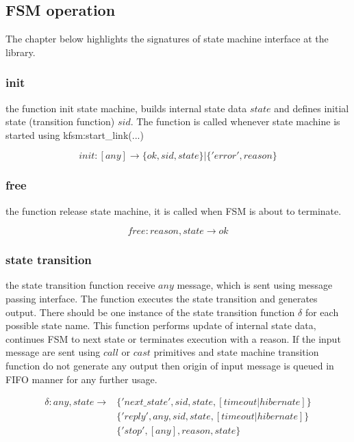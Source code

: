 \documentclass{report}
\begin{document}
\subsection{FSM operation}
   The chapter below highlights the signatures of state machine interface at 
   the library.

\subsubsection{init}
	the function init state machine, builds internal state data $state$ and defines
	initial state (transition function) $sid$. The function is called whenever 
	state machine is started using kfsm:start\_link(...)
	
	$$ init: [any] \longrightarrow \{ok, sid, state\} | \{'error', reason\} $$
	
	

\subsubsection{free}
	the function release state machine, it is called when FSM is about to terminate. 

	$$ free: reason,state  \longrightarrow  ok $$


\subsubsection{state transition}
	the state transition function receive $any$ message, which is sent using 
	message passing interface. The function executes the state transition and 
	generates output. There should be one instance of the state transition function 
	$\delta$ for each possible state name. This function performs update of 
	internal state data, continues FSM to next state or terminates execution
	with a reason. If the input message are sent using $call$ or $cast$ primitives
	and state machine transition function do not generate any output then origin
	of input message is queued in FIFO manner for any further usage.
	
	$$\begin{array}{ll}
	\delta: any,state \longrightarrow 
	   & \{'next\_state', sid, state, [timeout | hibernate]\} \\
	   & \{'reply', any,  sid, state, [timeout | hibernate]\} \\
	   	& \{'stop', [any], reason, state\}         \\
	\end{array}$$
\end{document}
